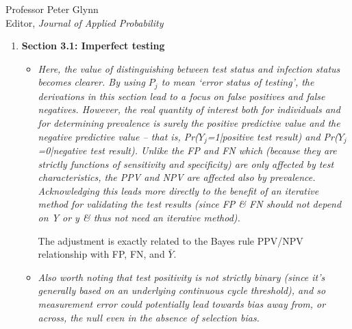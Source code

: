 \documentclass[11pt]{letter} %
\begin{document}
\begin{letter}{Professor
	Peter Glynn\\
	Editor, {\em Journal of Applied Probability}}
\begin{enumerate}
\begin{itemize}
	XXXXX
	\vspace{5mm}
	\item {\it Throughout, there is a general issue of too few distinct variable identifiers – for example, using Y to refer to infection status and y to refer to test status will likely lead to confusion.}
	\vspace{5mm}

	We clarify our choice of notation by adding an appendix with notation.
	\vspace{5mm}

	\item {\it The “natural candidate for AIR” presented is the quantity that has more commonly been referred to as the “test positivity rate” (assuming that yi does in fact indicate test status rather than infection status which is obviously unknown). It would be helpful to mention this.}
	\vspace{5mm}

	This is now stated explicitly
\end{itemize}
\item {\bf Section 3.1: Imperfect testing}
\begin{itemize}
	\item {\it Here, the value of distinguishing between test status and infection status becomes clearer. By using $P_j$ to mean ‘error status of testing’, the derivations in this section lead to a focus on false positives and false negatives. However, the real quantity of interest both for individuals and for determining prevalence is surely the positive predictive value and the negative predictive value – that is, Pr($Y_j$=1|positive test result) and Pr($Y_j$=0|negative test result). Unlike the FP and FN which (because they are strictly functions of sensitivity and specificity) are only affected by test characteristics, the PPV and NPV are affected also by prevalence. Acknowledging this leads more directly to the benefit of an iterative method for validating the test results (since FP \& FN should not depend on Y or y \& thus not need an iterative method).}
	\vspace{5mm}

	The adjustment is exactly related to the Bayes rule PPV/NPV relationship with FP, FN, and $\bar Y$.
	\vspace{5mm}
	\item {\it Also worth noting that test positivity is not strictly binary (since it’s generally based on an underlying continuous cycle threshold), and so measurement error could potentially lead towards bias away from, or across, the null even in the absence of selection bias.}
	\vspace{5mm}


\end{itemize}
\end{enumerate}
\end{letter}
\end{document}
